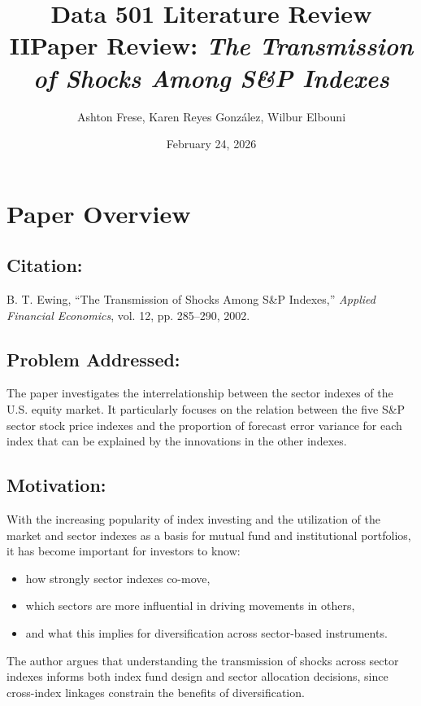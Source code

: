 \documentclass{article}
\title{Data 501 Literature Review II}
\author{Ashton Frese, Karen Reyes González, Wilbur Elbouni}
\date{February 24, 2026}
\begin{document}
\maketitle 
\title{Paper Review: \textit{The Transmission of Shocks Among S\&P Indexes}}

\section{Paper Overview}


\subsection{Citation:}  
B. T. Ewing, ``The Transmission of Shocks Among S\&P Indexes,'' \textit{Applied Financial Economics}, vol. 12, pp. 285--290, 2002.

\subsection{Problem Addressed:}  
The paper investigates the interrelationship between the sector indexes of the U.S. equity market. It particularly focuses on the relation between the five S\&P sector stock price indexes and the proportion of forecast error variance for each index that can be explained by the innovations in the other indexes.


\subsection{Motivation:}  
With the increasing popularity of index investing and the utilization of the market and sector indexes as a basis for mutual fund and institutional portfolios, it has become important for investors to know:

\begin{itemize}
    \item how strongly sector indexes co-move,
    \item which sectors are more influential in driving movements in others,
    \item and what this implies for diversification across sector-based instruments.
\end{itemize}

\noindent The author argues that understanding the transmission of shocks across sector indexes informs both index fund design and sector allocation decisions, since cross-index linkages constrain the benefits of diversification.
\end{document}
